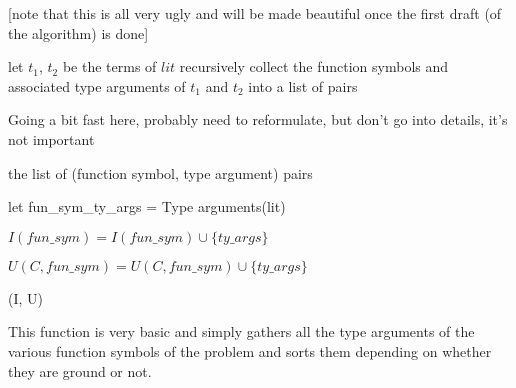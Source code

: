 \documentclass{article}
\begin{document}
[note that this is all very ugly and will be made beautiful once the first draft (of the algorithm) is done]

\begin{algorithm}[tbh]
\begin{algorithmic}[1]

   \State let \(t_1\), \(t_2\) be the terms of \(lit\)
   \State recursively collect the function symbols and associated type arguments of \(t_1\) and \(t_2\) into a list of pairs

   \State \Comment Going a bit fast here, probably need to reformulate, but don't go into details, it's not important

   \State \Return the list of (function symbol, type argument) pairs

\EndFunction
\end{algorithmic}
\end{algorithm}


\begin{algorithm}[tbh]
\begin{algorithmic}[1]
         \State let fun\_sym\_ty\_args = Type arguments(lit)

            \State \(I(fun\_sym) = I(fun\_sym) \cup \{ty\_args\}\)

         \Else

            \State \(U(C, fun\_sym) = U(C, fun\_sym) \cup \{ty\_args\}\)

         \EndIf
         \EndFor
      \EndFor
   \EndFor

   \State \Return (I, U)

\EndFunction
\end{algorithmic}
\end{algorithm}

This function is very basic and simply gathers all the type arguments of the various function symbols of the problem and sorts them depending on whether they are ground or not.
\end{document}
